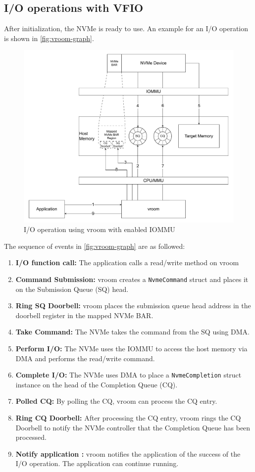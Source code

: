 \subsection{I/O operations with VFIO}
After initialization, the NVMe is ready to use. An example for an I/O operation is shown in \autoref{fig:vroom-graph}.
\begin{figure}[H]
    \centering
    \includegraphics[width=\textwidth]{figures/vroomdiagram.pdf}
    \caption{I/O operation using vroom with enabled IOMMU}
    \label{fig:vroom-graph}
\end{figure}
The sequence of events in \autoref{fig:vroom-graph} are as followed:
\begin{enumerate}
    \item \textbf{I/O function call:} The application calls a read/write method on vroom
    \item \textbf{Command Submission:} vroom creates a \texttt{NvmeCommand} struct and places it on the Submission Queue (SQ) head.
    \item \textbf{Ring SQ Doorbell:} vroom places the submission queue head address in the doorbell register in the mapped NVMe BAR.
    \item \textbf{Take Command:} The NVMe takes the command from the SQ using DMA.
    \item \textbf{Perform I/O:} The NVMe uses the IOMMU to access the host memory via DMA and performs the read/write command.
    \item \textbf{Complete I/O:} The NVMe uses DMA to place a \texttt{NvmeCompletion} struct instance on the head of the Completion Queue (CQ).
    \item \textbf{Polled CQ:} By polling the CQ, vroom can process the CQ entry.
    \item \textbf{Ring CQ Doorbell:} After processing the CQ entry, vroom rings the CQ Doorbell to notify the NVMe controller that the Completion Queue has been processed.
    \item \textbf{Notify application :} vroom notifies the application of the success of the I/O operation. The application can continue running.
\end{enumerate}

